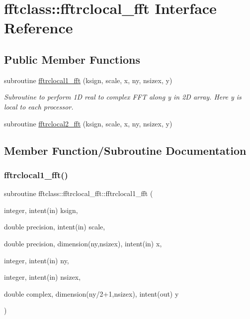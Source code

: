 \hypertarget{interfacefftclass_1_1fftrclocal__fft}{}\section{fftclass\+::fftrclocal\+\_\+fft Interface Reference}
\label{interfacefftclass_1_1fftrclocal__fft}
\subsection*{Public Member Functions}
\begin{DoxyCompactItemize}
\item 
subroutine \mbox{\hyperlink{interfacefftclass_1_1fftrclocal__fft_ad2f8e56358bf7655e35fac599301601a}{fftrclocal1\+\_\+fft}} (ksign, scale, x, ny, nsizex, y)
\begin{DoxyCompactList}\small\item\em Subroutine to perform 1D real to complex F\+FT along y in 2D array. Here y is local to each processor. \end{DoxyCompactList}\item 
subroutine \mbox{\hyperlink{interfacefftclass_1_1fftrclocal__fft_ab6b99a37c96bc0208402cced3fc85b5f}{fftrclocal2\+\_\+fft}} (ksign, scale, x, ny, nsizex, y)
\end{DoxyCompactItemize}


\subsection{Member Function/\+Subroutine Documentation}
\mbox{\label{interfacefftclass_1_1fftrclocal__fft_ad2f8e56358bf7655e35fac599301601a}} 
\subsubsection{\texorpdfstring{fftrclocal1\_fft()}{fftrclocal1\_fft()}}
{\footnotesize\ttfamily subroutine fftclass\+::fftrclocal\+\_\+fft\+::fftrclocal1\+\_\+fft (\begin{DoxyParamCaption}\item[{integer, intent(in)}]{ksign,  }\item[{double precision, intent(in)}]{scale,  }\item[{double precision, dimension(ny,nsizex), intent(in)}]{x,  }\item[{integer, intent(in)}]{ny,  }\item[{integer, intent(in)}]{nsizex,  }\item[{double complex, dimension(ny/2+1,nsizex), intent(out)}]{y }\end{DoxyParamCaption})}




